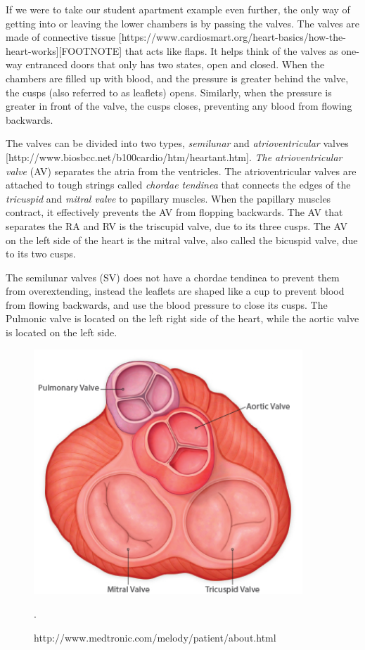 If we were to take our student apartment example even further, the only way of getting into or leaving the lower chambers is by passing the valves. The valves are made of connective tissue [https://www.cardiosmart.org/heart-basics/how-the-heart-works][FOOTNOTE] that acts like flaps. It helps think of the valves as one-way entranced doors that only has two states, open and closed. When the chambers are filled up with blood, and the pressure is greater behind the valve, the cusps (also referred to as leaflets) opens. Similarly, when the pressure is greater in front of the valve, the cusps closes, preventing any blood from flowing backwards. 

The valves can be divided into two types, \textit{semilunar} and \textit{atrioventricular} valves [http://www.biosbcc.net/b100cardio/htm/heartant.htm]. \textit{The atrioventricular valve} (AV) separates the atria from the ventricles. The atrioventricular valves are attached to tough strings called \textit{chordae tendinea} that connects the edges of the \textit{tricuspid} and  \textit{mitral valve} to papillary muscles. When the papillary muscles contract, it effectively prevents the AV from flopping backwards. %
The  AV that separates the RA and RV is the triscupid valve, due to its three cusps. The AV on the left side of the heart is the mitral valve, also called the bicuspid valve, due to its two cusps. 

The semilunar valves (SV) does not have a chordae tendinea to prevent them from overextending, instead the leaflets are shaped like a cup to prevent blood from flowing backwards, and use the blood pressure to close its cusps. The Pulmonic valve is located on the left right side of the heart, while the aortic valve is located on the left side.

\begin{figure}[h]
 \centering 
     \includegraphics[width=0.9\textwidth]{bilder/b_heart_valves}
     \caption{http://www.medtronic.com/melody/patient/about.html}.
     \label{b_heart_valves.png}
\end{figure}


